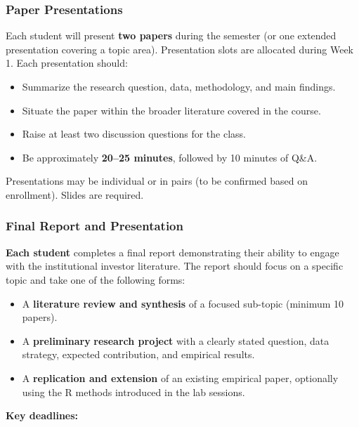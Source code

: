 \documentclass[
  12pt,
  letterpaper,
  DIV=11,
  numbers=noendperiod]{scrartcl}
\providecommand{\tightlist}{%
  \setlength{\itemsep}{0pt}\setlength{\parskip}{0pt}}
\begin{document}
\subsubsection{Paper Presentations}\label{paper-presentations}

Each student will present \textbf{two papers} during the semester (or
one extended presentation covering a topic area). Presentation slots are
allocated during Week 1. Each presentation should:

\begin{itemize}
\tightlist
\item
  Summarize the research question, data, methodology, and main findings.
\item
  Situate the paper within the broader literature covered in the course.
\item
  Raise at least two discussion questions for the class.
\item
  Be approximately \textbf{20--25 minutes}, followed by 10 minutes of
  Q\&A.
\end{itemize}

Presentations may be individual or in pairs (to be confirmed based on
enrollment). Slides are required.

\subsubsection{Final Report and
Presentation}\label{final-report-and-presentation}

\textbf{Each student} completes a final report demonstrating their
ability to engage with the institutional investor literature. The report
should focus on a specific topic and take one of the following forms:

\begin{itemize}
\tightlist
\item
  A \textbf{literature review and synthesis} of a focused sub-topic
  (minimum 10 papers).
\item
  A \textbf{preliminary} \textbf{research project} with a clearly stated
  question, data strategy, expected contribution, and empirical results.
\item
  A \textbf{replication and extension} of an existing empirical paper,
  optionally using the R methods introduced in the lab sessions.
\end{itemize}

\textbf{Key deadlines:}
\end{document}
